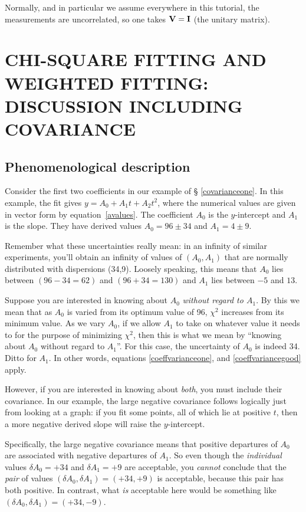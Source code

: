 \documentclass[psfig,preprint]{aastex}
\begin{document}
	Normally, and in particular we assume everywhere in this
tutorial, the measurements are uncorrelated, so one takes ${\bf V} =
{\bf I}$ (the unitary matrix). 

\section{CHI-SQUARE FITTING AND WEIGHTED FITTING: DISCUSSION INCLUDING
COVARIANCE } \label{chicoeffs}

\subsection{ Phenomenological description}

	Consider the first two coefficients in our example of \S
\ref{covarianceone}.  In this example, the fit gives $y = A_0 + A_1 t +
A_2 t^2$, where the numerical values are given in vector form by
equation~\ref{avalues}. The coefficient $A_0$ is the $y$-intercept and
$A_1$ is the slope. They have derived values $A_0 = 96 \pm 34$ and $A_1
= 4 \pm 9$. 

	Remember what these uncertainties really mean: in an infinity of
similar experiments, you'll obtain an infinity of values of $(A_0,A_1)$
that are normally distributed with dispersions (34,9).  Loosely
speaking, this means that $A_0$ lies between $(96-34=62)$ and
$(96+34=130)$ and $A_1$ lies between $-5$ and $13$.  

	Suppose you are interested in knowing about $A_0$ {\it without
regard to $A_1$}. By this we mean that as $A_0$ is varied from its
optimum value of 96, $\chi^2$ increases from its minimum value.  As we
vary $A_0$, if we allow $A_1$ to take on whatever value it needs to for
the purpose of minimizing $\chi^2$, then this is what we mean by
``knowing about $A_0$ without regard to $A_1$''.  For this case, the
uncertainty of $A_0$ is indeed 34. Ditto for $A_1$.  In other words,
equations \ref{coeffvarianceone}, and \ref{coeffvariancegood} apply. 

	However, if you are interested in knowing about {\it both}, you
must include their covariance.  In our example, the large negative
covariance follows logically just from looking at a graph: if you fit
some points, all of which lie at positive $t$, then a more negative
derived slope will raise the $y$-intercept. 

	Specifically, the large negative covariance means that positive
departures of $A_0$ are associated with negative departures of $A_1$. 
So even though the {\it individual} values $\delta A_0=+34$ and $\delta
A_1=+9$ are acceptable, you {\it cannot} conclude that the {\it pair} of
values $(\delta A_0,\delta A_1) = (+34, +9)$ is acceptable, because this
pair has both positive.  In contrast, what {\it is} acceptable here
would be something like $(\delta A_0,\delta A_1) = (+34, -9)$. 
\end{document}
